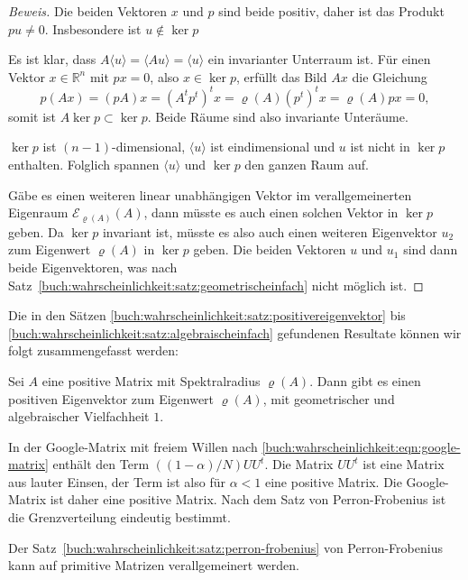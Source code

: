 \begin{proof}[Beweis]
Die beiden Vektoren $x$ und $p$ sind beide positiv, daher ist das 
Produkt $pu\ne 0$.
Insbesondere ist $u\not\in\ker p$

Es ist klar, dass $A\langle u\rangle = \langle Au\rangle = \langle u\rangle$
ein invarianter Unterraum ist.
Für einen Vektor $x\in\mathbb{R}^n$ mit $px=0$, also $x\in\ker p$,
erfüllt das Bild $Ax$ die Gleichung
\[
p(Ax)=(pA)x=(A^tp^t)^tx=
\varrho(A)(p^t)^tx
=
\varrho(A)px = 0,
\]
somit ist $A\ker p \subset \ker p$.
Beide Räume sind also invariante Unteräume.

$\ker p$ ist $(n-1)$-dimensional, $\langle u\rangle$ ist eindimensional
und $u$ ist nicht in $\ker p$ enthalten.
Folglich spannen $\langle u\rangle$ und $\ker p$ den ganzen Raum auf.

Gäbe es einen weiteren linear unabhängigen Vektor im verallgemeinerten
Eigenraum $\mathcal{E}_{\varrho(A)}(A)$, dann müsste es auch einen
solchen Vektor in $\ker p$ geben.
Da $\ker p$ invariant ist, müsste es also auch einen weiteren Eigenvektor
$u_2$ zum Eigenwert $\varrho(A)$ in $\ker p$ geben.
Die beiden Vektoren $u$ und $u_1$ sind dann beide Eigenvektoren, was
nach Satz~\ref{buch:wahrscheinlichkeit:satz:geometrischeinfach}
nicht möglich ist.
\end{proof}

Die in den Sätzen
\ref{buch:wahrscheinlichkeit:satz:positivereigenvektor}
bis
\ref{buch:wahrscheinlichkeit:satz:algebraischeinfach}
gefundenen Resultate können wir folgt zusammengefasst werden:

\begin{satz}
\label{buch:wahrscheinlichkeit:satz:perron-frobenius}
Sei $A$ eine positive Matrix mit Spektralradius $\varrho(A)$.
Dann gibt es einen positiven Eigenvektor zum Eigenwert $\varrho(A)$,
mit geometrischer und algebraischer Vielfachheit $1$.
\end{satz}

\begin{beispiel}
In der Google-Matrix mit freiem Willen
nach
\eqref{buch:wahrscheinlichkeit:eqn:google-matrix}
enthält den Term $((1-\alpha)/N)UU^t$.
Die Matrix $UU^t$ ist eine Matrix aus lauter Einsen, der Term
ist also für $\alpha < 1$ eine positive Matrix.
Die Google-Matrix ist daher eine positive Matrix.
Nach dem Satz von Perron-Frobenius ist die Grenzverteilung
eindeutig bestimmt.
\end{beispiel}

Der Satz~\ref{buch:wahrscheinlichkeit:satz:perron-frobenius}
von Perron-Frobenius kann auf primitive Matrizen verallgemeinert
werden.

